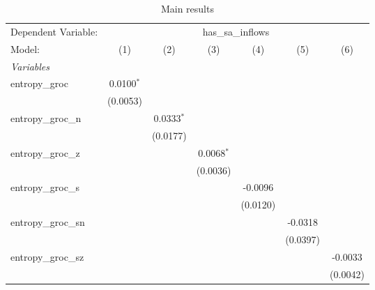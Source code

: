 
\begin{table}[htbp]
   \centering
   \footnotesize
   \begin{threeparttable}[b]
      \caption{\label{tab:reg_has_sa_inflows_groc.tex} Main results}
      \begin{tabular}{lcccccc}
         \tabularnewline \midrule \midrule
         Dependent Variable: & \multicolumn{6}{c}{has\_sa\_inflows}\\
         Model:              & (1)            & (2)            & (3)            & (4)            & (5)            & (6)\\  
         \midrule
         \emph{Variables}\\
         entropy\_groc       & 0.0100$^{*}$   &                &                &                &                &   \\   
                             & (0.0053)       &                &                &                &                &   \\   
         entropy\_groc\_n    &                & 0.0333$^{*}$   &                &                &                &   \\   
                             &                & (0.0177)       &                &                &                &   \\   
         entropy\_groc\_z    &                &                & 0.0068$^{*}$   &                &                &   \\   
                             &                &                & (0.0036)       &                &                &   \\   
         entropy\_groc\_s    &                &                &                & -0.0096        &                &   \\   
                             &                &                &                & (0.0120)       &                &   \\   
         entropy\_groc\_sn   &                &                &                &                & -0.0318        &   \\   
                             &                &                &                &                & (0.0397)       &   \\   
         entropy\_groc\_sz   &                &                &                &                &                & -0.0033\\   
                             &                &                &                &                &                & (0.0042)\\   

\end{tabular}
\end{threeparttable}
\end{table}
